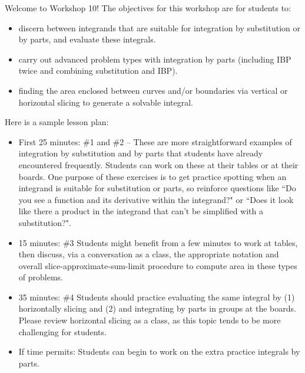 \documentclass{article}
\begin{document}
\begin{workshop}
    Welcome to Workshop 10! The objectives for this workshop are for students to:
    \begin{itemize}
        \item discern between integrands that are suitable for integration by substitution or by parts, and evaluate these integrals.
        \item carry out advanced problem types with integration by parts (including IBP twice and combining substitution and IBP).
        \item finding the area enclosed between curves and/or boundaries via vertical or horizontal slicing to generate a solvable integral.
    \end{itemize}
    Here is a sample lesson plan:
    \begin{itemize}
        \item First 25 minutes: \#1 and \#2 -- These are more straightforward examples of integration by substitution and by parts that students have already encountered frequently. Students can work on these at their tables or at their boards. One purpose of these exercises is to get practice spotting when an integrand is suitable for substitution or parts, so reinforce questions like ``Do you see a function and its derivative within the integrand?" or ``Does it look like there a product in the integrand that can't be simplified with a substitution?".
        \item 15 minutes: \#3 Students might benefit from a few minutes to work at tables, then discuss, via a conversation as a class, the appropriate notation and overall slice-approximate-sum-limit procedure to compute area in these types of problems.
        \item 35 minutes: \#4 Students should practice evaluating the same integral by (1) horizontally slicing and (2) and integrating by parts in groups at the boards. Please review horizontal slicing as a class, as this topic tends to be more challenging for students.
        \item If time permits: Students can begin to work on the extra practice integrals by parts.
    \end{itemize}
\end{workshop}
\end{document}
